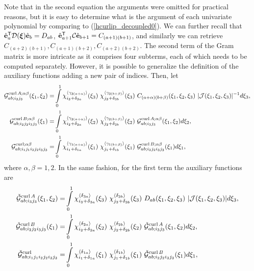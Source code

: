 Note that in the second equation the arguments were omitted for practical reasons, but it is easy to determine what is the argument of each univariate polynomial by comparing to (\ref{hcurlip_decoupled0}). We can further recall that $\hat{\mathbf{e}}_a^{\mathsf{T}}\mathcal{D}(\boldsymbol{\xi})\hat{\mathbf{e}}_b=D_{ab}$, $\hat{\mathbf{e}}_{a+1}^{\mathsf{T}}\mathcal{C}\hat{\mathbf{e}}_{b+1}=C_{(a+1)(b+1)}$, and similarly we can retrieve $C_{(a+2)(b+1)},C_{(a+1)(b+2)},C_{(a+2)(b+2)}$. The second term of the Gram matrix is more intricate as it comprises four subterms, each of which needs to be computed separately. However, it is possible to generalize the definition of the auxiliary functions adding a new pair of indices. Then, let 
% 
\begin{align}
    \mcG^{\curl A;\alpha \beta}_{ab;i_3j_3}(\xi_1,\xi_2)=&\int\limits_0^1
    \chi_{i_3+\delta_{3a}}^{\langle\gamma_{3(a+\alpha)}\rangle}(\xi_3)\ 
    \chi_{j_3+\delta_{3b}}^{\langle\gamma_{3(b+\beta )}\rangle}(\xi_3)\  C_{(a+\alpha)(b+\beta)}(\xi_1,\xi_2,\xi_3)\ |\mcJ(\xi_1,\xi_2,\xi_3)|^{-1}d\xi_3,
    \label{GA_hcurl1}\\
    \mcG^{\curl B;\alpha \beta}_{ab;i_2j_2i_3j_3}(\xi_1)=&\int\limits_0^1
    \chi_{i_2+\delta_{2a}}^{\langle\gamma_{2(a+\alpha)}\rangle}(\xi_2)\ 
    \chi_{j_2+\delta_{2b}}^{\langle\gamma_{2(b+\beta )}\rangle}(\xi_2)\ 
    \mcG^{\curl A;\alpha \beta}_{ab;i_3j_3}(\xi_1,\xi_2)d\xi_2,
    \label{GB_hcurl1}\\
    \mcG^{\curl;\alpha \beta}_{ab;i_1j_1i_2j_2i_3j_3}=&\int\limits_0^1
    \chi_{i_1+\delta_{1a}}^{\langle\gamma_{1(a+\alpha)}\rangle}(\xi_1)\ 
    \chi_{j_1+\delta_{1b}}^{\langle\gamma_{1(b+\beta )}\rangle}(\xi_1)\ 
    \mcG^{\curl B;\alpha \beta}_{ab;i_2j_2i_3j_3}(\xi_1)d\xi_1,
    \label{ip_hcurl1_GAB}    
\end{align}
%
where $\alpha,\beta=1,2$. In the same fashion, for the first term the auxiliary functions are
\begin{align}
    \check{\mcG}^{\curl A}_{ab;i_3j_3}(\xi_1,\xi_2)=&\int\limits_0^1
    \chi_{i_3+\delta_{3a}}^{\langle\delta_{3a}\rangle}(\xi_3)\  \chi_{j_3+\delta_{3b}}^{\langle\delta_{3b}\rangle}(\xi_3)\  D_{ab}(\xi_1,\xi_2,\xi_3)\ |\mcJ(\xi_1,\xi_2,\xi_3)|d\xi_3,
    \label{GA_hcurl0}\\
    \check{\mcG}^{\curl B}_{ab;i_2j_2i_3j_3}(\xi_1)=&\int\limits_0^1
    \chi_{i_2+\delta_{2a}}^{\langle\delta_{2a}\rangle}(\xi_2)\  \chi_{j_2+\delta_{2b}}^{\langle\delta_{2b}\rangle}(\xi_2)\ 
    \check{\mcG}^{\curl A}_{ab;i_3j_3}(\xi_1,\xi_2)d\xi_2,
    \label{GB_hcurl0}\\
    \check{\mcG}^{\curl}_{ab;i_1j_1i_2j_2i_3j_3}=&\int\limits_0^1
    \chi_{i_1+\delta_{1a}}^{\langle\delta_{1a}\rangle}(\xi_1)\  \chi_{j_1+\delta_{1b}}^{\langle\delta_{1b}\rangle}(\xi_1)\ 
    \check{\mcG}^{\curl B}_{ab;i_2j_2i_3j_3}(\xi_1)d\xi_1,
    \label{ip_hcurl0_GAB}
\end{align}

